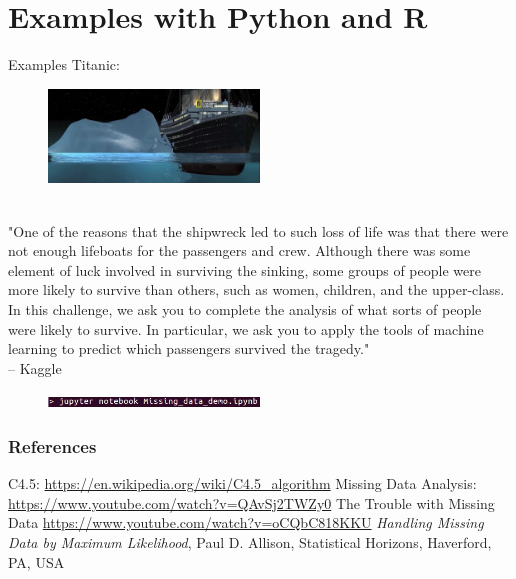 \documentclass{beamer}
\begin{document}
\section{Examples with Python and R}
\begin{frame}{Examples}
Titanic:\\
\begin{figure}[h!]
	\includegraphics[width=0.5\textwidth]{titanic.png}
\end{figure}
\-\ \\
"One of the reasons that the shipwreck led to such loss of life was that there were not enough lifeboats for the passengers and crew. Although there was some element of luck involved in surviving the sinking, some groups of people were more likely to survive than others, such as women, children, and the upper-class.\\

In this challenge, we ask you to complete the analysis of what sorts of people were likely to survive. In particular, we ask you to apply the tools of machine learning to predict which passengers survived the tragedy."\\ -- Kaggle
\begin{figure}[h!]
	\includegraphics[width=0.5\textwidth]{ipython.png}
\end{figure}
\end{frame}
\begin{frame}
\frametitle{References}
\footnotesize{
\begin{thebibliography}{9} %
C4.5: \url{https://en.wikipedia.org/wiki/C4.5_algorithm}
Missing Data Analysis: \url{https://www.youtube.com/watch?v=QAvSj2TWZy0}
The Trouble with Missing Data \url{https://www.youtube.com/watch?v=oCQbC818KKU}
 \textit{Handling Missing Data by Maximum Likelihood}, Paul D. Allison, Statistical Horizons, Haverford, PA, USA
\end{thebibliography}
}
\end{frame}



\end{document}

